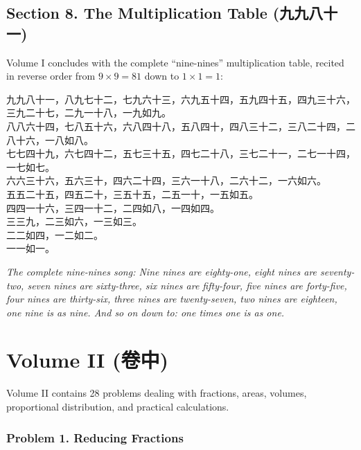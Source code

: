 \documentclass[11pt,a4paper]{article}
\newcommand{\zh}[1]{{\CJKfamily{}#1}}
\begin{document}
\subsection*{Section 8. The Multiplication Table (\zh{九九八十一})}

Volume I concludes with the complete ``nine-nines'' multiplication table, recited in reverse order from $9 \times 9 = 81$ down to $1 \times 1 = 1$:

\begin{prefacebox}
\zh{九九八十一，八九七十二，七九六十三，六九五十四，五九四十五，四九三十六，三九二十七，二九一十八，一九如九。\\
八八六十四，七八五十六，六八四十八，五八四十，四八三十二，三八二十四，二八十六，一八如八。\\
七七四十九，六七四十二，五七三十五，四七二十八，三七二十一，二七一十四，一七如七。\\
六六三十六，五六三十，四六二十四，三六一十八，二六十二，一六如六。\\
五五二十五，四五二十，三五十五，二五一十，一五如五。\\
四四一十六，三四一十二，二四如八，一四如四。\\
三三九，二三如六，一三如三。\\
二二如四，一二如二。\\
一一如一。}
\end{prefacebox}

\textit{The complete nine-nines song: Nine nines are eighty-one, eight nines are seventy-two, seven nines are sixty-three, six nines are fifty-four, five nines are forty-five, four nines are thirty-six, three nines are twenty-seven, two nines are eighteen, one nine is as nine. And so on down to: one times one is as one.}

\newpage

\section{Volume II (\zh{卷中})}

Volume II contains 28 problems dealing with fractions, areas, volumes, proportional distribution, and practical calculations.

\subsubsection*{Problem 1. Reducing Fractions}
\end{document}
